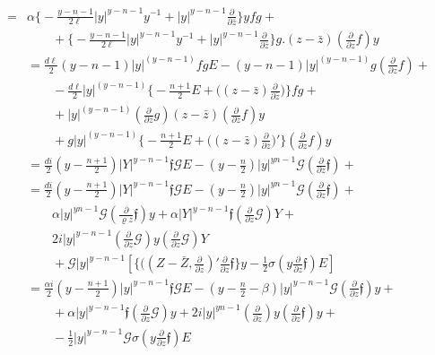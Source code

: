 \begin{align*}
= & \alpha \bigg \{ - \frac{y-n-1}{2
  \ell}|y|^{y-n-1}y^{-1}+|y|^{y-n-1}\frac{\partial}{\partial
  \bar{z}}\bigg \}y fg +\\ 
 & \qquad + \bigg \{ - \frac{y-n-1}{2
  \ell}|y|^{y-n-1}y^{-1}+|y|^{y-n-1}\frac{\partial}{\partial
  \bar{z}}\bigg \}g.(z-\bar{z})(\frac{\partial}{\partial z} f)y\\ 
 & =  \frac{d \ell }{2}(y-n-1)|y|^(y-n-1)fg
E-(y-n-1)|y|^(y-n-1)g(\frac{\partial}{\partial z}f)+\\ 
 & \qquad - \frac{d \ell
}{2}|y|^{(y-n-1)}\bigg\{-\frac{n+1}{2}E+\bigg((z-\bar{z})\frac{\partial}{\partial  
  \bar{z}}\bigg ) \bigg \} fg+\\ 
 & \qquad +  |y|^{(y-n-1)}(\frac {\partial}{\partial \bar{z}}
g)(z-\bar{z})(\frac {\partial}{\partial \bar{z}}f)y \\ 
 & \qquad + g
|y|^{(y-n-1)}\bigg\{-\frac{n+1}{2}E+\bigg((z-\bar{z})\frac{\partial}{\partial 
  \bar{z}}\bigg )' \bigg \}(\frac{\partial}{\partial z}f)y \\
 & = \frac{di } {2} (y - \frac{n + 1 }{2}) |Y|^{y - n - 1 }
\mathfrak{f} \mathcal{G}  E - (y - \frac{n}{2}) | y |^{y n -
  1 } \mathcal{G} (\frac{\partial}{\partial z} \mathfrak{f}) + \\ 
 & = \frac{di } {2} (y - \frac{n + 1 }{2}) |Y|^{y - n - 1 }
\mathfrak{f} \mathcal{G}  E - (y - \frac{n}{2}) | y |^{y n -
  1 } \mathcal{G} (\frac{\partial}{\partial z} \mathfrak{f}) + \\ 
 & \qquad \alpha | y |^{y n - 1 } \mathcal {G } (\frac{\partial
}{\varrho z} \mathfrak{f}) y + \alpha |Y|^{y - n - 1 }
\mathfrak{f} (\frac{\partial}{\partial z } \mathcal{G}) Y + \\ 
 & \qquad 2 i |y |^{y - n- 1} (\frac{\partial } {\partial z }
\mathcal{G}) y (\frac{\partial } {\partial z } \mathscr{G}) Y \\ 
 & \qquad + \mathcal{G} |y|^{y - n -1}[\{ (( Z -\bar{Z},
  \frac{\partial}{\partial \bar{z}})' \frac{\partial}{\partial z}
  \mathfrak{f}\} y - \frac{1}{2} \sigma (y \frac{\partial}{\partial z}
  \mathfrak{f}) E]\\ 
 & = \frac{\alpha i}{2} (y - \frac{n+1}{2}) |y|^{y - n -1}
\mathfrak{f} \mathcal{G} E - (y - \frac{n}{2}- \beta )|y|^{y
  -n -1}\mathcal{G}( \frac{\partial} {\partial z} \mathfrak{f}) y +\\ 
 & \qquad + \alpha |y|^{y -n -1} \mathfrak{f}(\frac{\partial}{\partial z}
\mathcal{G}) y + 2i |y|^{y n-1} (\frac{\partial}{\partial
  \bar{z}}) y (\frac{\partial}{\partial z} \mathfrak{f}) y+\\ 
 & \qquad - \frac{1}{2} |y|^{y - n - 1} \mathcal{G}\sigma  (y
\frac{\partial}{\partial z} \mathfrak{f}) E \tag{341}\label{eq341}   
 \end{align*}\pageoriginale
 
